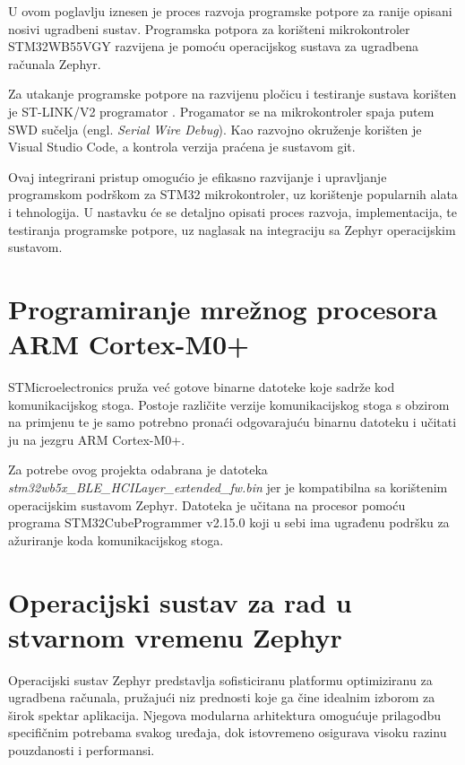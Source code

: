 \documentclass[../diplomski_rad.tex]{subfiles}
\begin{document}
\sloppy

\justifying

U ovom poglavlju iznesen je proces razvoja programske potpore za ranije opisani nosivi ugradbeni sustav. 
Programska potpora za korišteni mikrokontroler STM32WB55VGY razvijena je pomoću operacijskog sustava 
za ugradbena računala Zephyr.

Za utakanje programske potpore na razvijenu pločicu i testiranje sustava korišten je ST-LINK/V2 programator \cite{stm32programator}. 
Progamator se na mikrokontroler spaja putem SWD sučelja (engl. \textit{Serial Wire Debug}). 
Kao razvojno okruženje korišten je Visual Studio Code, a kontrola verzija praćena je sustavom git.

Ovaj integrirani pristup omogućio je efikasno razvijanje i upravljanje programskom podrškom za STM32 mikrokontroler, 
uz korištenje popularnih alata i tehnologija. 
U nastavku će se detaljno opisati proces razvoja, implementacija, te testiranja programske potpore, 
uz naglasak na integraciju sa Zephyr operacijskim sustavom.

\section{Programiranje mrežnog procesora ARM Cortex-M0+}

STMicroelectronics pruža već gotove binarne datoteke \cite{kodovi_M0} koje sadrže kod komunikacijskog stoga. 
Postoje različite verzije komunikacijskog stoga s obzirom na primjenu te je samo potrebno pronaći odgovarajuću 
binarnu datoteku i učitati ju na jezgru ARM Cortex-M0+.

Za potrebe ovog projekta odabrana je datoteka \textit{stm32wb5x\_BLE\_HCILayer\_extended\_fw.bin} jer je kompatibilna sa 
korištenim operacijskim sustavom Zephyr. Datoteka je učitana na procesor pomoću programa STM32CubeProgrammer v2.15.0 
koji u sebi ima ugrađenu podršku za ažuriranje koda komunikacijskog stoga. 

\section{Operacijski sustav za rad u stvarnom vremenu Zephyr}

Operacijski sustav Zephyr predstavlja sofisticiranu platformu optimiziranu za ugradbena računala, 
pružajući niz prednosti koje ga čine idealnim izborom za širok spektar aplikacija. 
Njegova modularna arhitektura omogućuje prilagodbu specifičnim potrebama svakog uređaja, 
dok istovremeno osigurava visoku razinu pouzdanosti i performansi.
\end{document}
